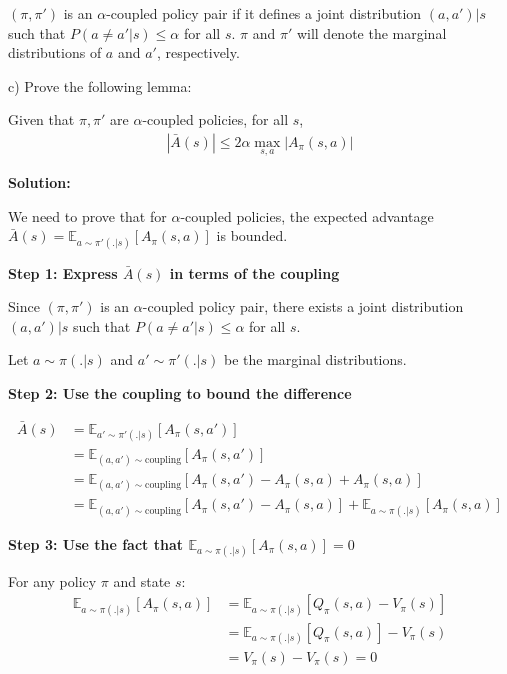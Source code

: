 \begin{definition}
    $(\pi, \pi')$ is an $\alpha$-coupled policy pair if it defines a joint distribution $(a, a')|s$ such that $P(a \neq a'|s) \le \alpha$ for all $s$. $\pi$ and $\pi'$ will denote the marginal distributions of $a$ and $a'$, respectively.
\end{definition}

c) Prove the following lemma:

\begin{lemma}
    Given that $\pi, \pi'$ are $\alpha$-coupled policies, for all $s$,
    \begin{align*}
        |\bar{A}(s)| \le 2\alpha \max_{s, a}|A_{\pi}(s,a)|
    \end{align*}
\end{lemma}

\textbf{Solution:}

We need to prove that for $\alpha$-coupled policies, the expected advantage $\bar{A}(s) = \mathbb{E}_{a \sim \pi'(.|s)}[A_{\pi}(s, a)]$ is bounded.

\textbf{Step 1: Express $\bar{A}(s)$ in terms of the coupling}

Since $(\pi, \pi')$ is an $\alpha$-coupled policy pair, there exists a joint distribution $(a, a')|s$ such that $P(a \neq a'|s) \le \alpha$ for all $s$.

Let $a \sim \pi(.|s)$ and $a' \sim \pi'(.|s)$ be the marginal distributions.

\textbf{Step 2: Use the coupling to bound the difference}

\begin{align}
\bar{A}(s) &= \mathbb{E}_{a' \sim \pi'(.|s)}[A_{\pi}(s, a')] \\
&= \mathbb{E}_{(a,a') \sim \text{coupling}}[A_{\pi}(s, a')] \\
&= \mathbb{E}_{(a,a') \sim \text{coupling}}[A_{\pi}(s, a') - A_{\pi}(s, a) + A_{\pi}(s, a)] \\
&= \mathbb{E}_{(a,a') \sim \text{coupling}}[A_{\pi}(s, a') - A_{\pi}(s, a)] + \mathbb{E}_{a \sim \pi(.|s)}[A_{\pi}(s, a)]
\end{align}

\textbf{Step 3: Use the fact that $\mathbb{E}_{a \sim \pi(.|s)}[A_{\pi}(s, a)] = 0$}

For any policy $\pi$ and state $s$:
\begin{align}
\mathbb{E}_{a \sim \pi(.|s)}[A_{\pi}(s, a)] &= \mathbb{E}_{a \sim \pi(.|s)}[Q_{\pi}(s, a) - V_{\pi}(s)] \\
&= \mathbb{E}_{a \sim \pi(.|s)}[Q_{\pi}(s, a)] - V_{\pi}(s) \\
&= V_{\pi}(s) - V_{\pi}(s) = 0
\end{align}

